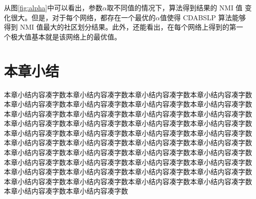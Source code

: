 从图\ref{fig:alpha}中可以看出，参数$\alpha$取不同值的情况下，算法得到结果的 NMI 值
变化很大。但是，对于每个网络，都存在一个最优的$\alpha$值使得 CDABSLP 算法能够
得到 NMI 值最大的社区划分结果。此外，还能看出，在每个网络上得到的第一
个极大值基本就是该网络上的最优值。



\section{本章小结}
本章小结内容凑字数本章小结内容凑字数本章小结内容凑字数本章小结内容凑字数本章小结内容凑字数本章小结内容凑字数本章小结内容凑字数本章小结内容凑字数本章小结内容凑字数本章小结内容凑字数本章小结内容凑字数本章小结内容凑字数本章小结内容凑字数本章小结内容凑字数本章小结内容凑字数本章小结内容凑字数本章小结内容凑字数本章小结内容凑字数本章小结内容凑字数本章小结内容凑字数本章小结内容凑字数本章小结内容凑字数本章小结内容凑字数本章小结内容凑字数本章小结内容凑字数本章小结内容凑字数本章小结内容凑字数本章小结内容凑字数本章小结内容凑字数本章小结内容凑字数本章小结内容凑字数本章小结内容凑字数本章小结内容凑字数本章小结内容凑字数本章小结内容凑字数本章小结内容凑字数本章小结内容凑字数本章小结内容凑字数本章小结内容凑字数本章小结内容凑字数本章小结内容凑字数本章小结内容凑字数
